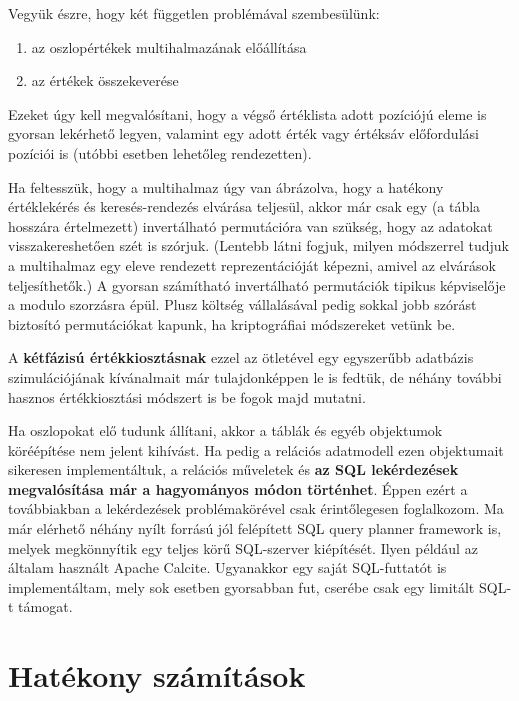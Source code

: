 \documentclass[
    parspace,
    noindent,
    nohyp,
]{elteiktdk}[2023/04/10]
\begin{document}
Vegyük észre, hogy két független problémával szembesülünk:

\begin{enumerate}
    \item az oszlopértékek multihalmazának előállítása
    \item az értékek összekeverése
\end{enumerate}





Ezeket úgy kell megvalósítani, hogy a végső értéklista adott pozíciójú eleme is gyorsan lekérhető legyen,
valamint egy adott érték vagy értéksáv előfordulási pozíciói is
(utóbbi esetben lehetőleg rendezetten).

Ha feltesszük, hogy a multihalmaz úgy van ábrázolva,
hogy a hatékony értéklekérés és keresés-rendezés elvárása teljesül,
akkor már csak egy (a tábla hosszára értelmezett) invertálható permutációra van szükség,
hogy az adatokat visszakereshetően szét is szórjuk.
(Lentebb látni fogjuk, milyen módszerrel tudjuk a multihalmaz egy eleve rendezett reprezentációját képezni,
amivel az elvárások teljesíthetők.)
A gyorsan számítható invertálható permutációk tipikus képviselője a modulo szorzásra épül.
Plusz költség vállalásával pedig sokkal jobb szórást biztosító permutációkat kapunk,
ha kriptográfiai módszereket vetünk be.

A \textbf{kétfázisú értékkiosztásnak} ezzel az ötletével
egy egyszerűbb adatbázis szimulációjának kívánalmait már tulajdonképpen le is fedtük,
de néhány további hasznos értékkiosztási módszert is be fogok majd mutatni.

Ha oszlopokat elő tudunk állítani,
akkor a táblák és egyéb objektumok köréépítése nem jelent kihívást.
Ha pedig a relációs adatmodell ezen objektumait sikeresen implementáltuk,
a relációs műveletek és \textbf{az SQL lekérdezések megvalósítása már a hagyományos módon történhet}.
Éppen ezért a továbbiakban a lekérdezések problémakörével csak érintőlegesen foglalkozom.
Ma már elérhető néhány nyílt forrású jól felépített SQL query planner framework is,
melyek megkönnyítik egy teljes körű SQL-szerver kiépítését.
Ilyen például az általam használt Apache Calcite.
Ugyanakkor egy saját SQL-futtatót is implementáltam, mely sok esetben gyorsabban fut,
cserébe csak egy limitált SQL-t támogat.

\section{Hatékony számítások}
\end{document}

